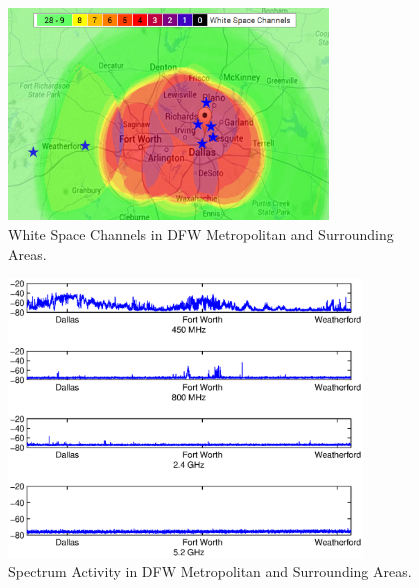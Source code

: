 \begin{figure}
\centering
\includegraphics[width=85mm]{figures/drivemap}
\caption{White Space Channels in DFW Metropolitan and Surrounding Areas.}                                                                 
\label{fig:drivemap}
\vspace{0.1in}
\end{figure}
   
\begin{figure}
\centering
\includegraphics[width=94mm]{figures/drivetest}
\caption{Spectrum Activity in DFW Metropolitan and Surrounding Areas.}                                                                 
\label{fig:drivetest}
\end{figure}

